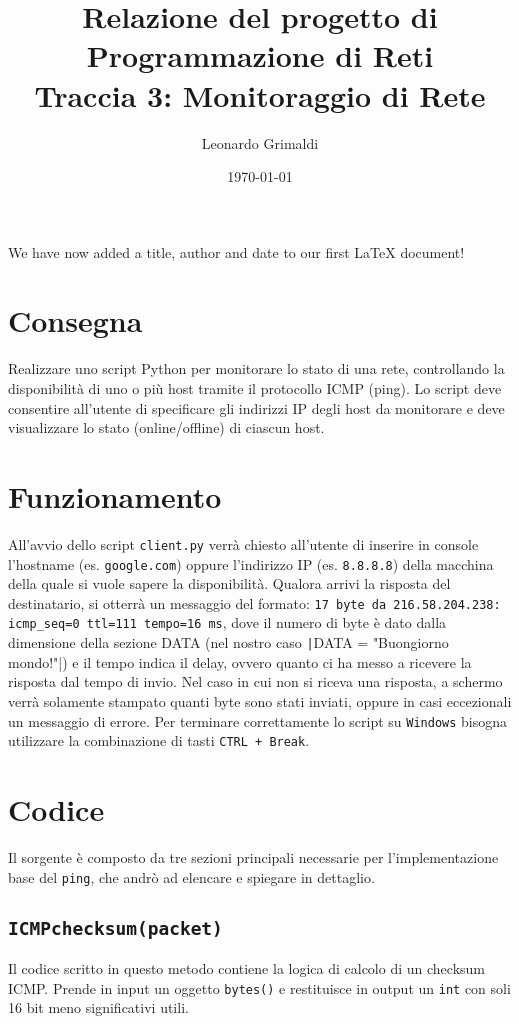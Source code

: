 \documentclass[a4paper,12pt]{report}
\title{Relazione del progetto di Programmazione di Reti 
    \\ Traccia 3: Monitoraggio di Rete}
\author{Leonardo Grimaldi}
\date{\today}
\begin{document}
\maketitle
We have now added a title, author and date to our first \LaTeX{} document!
\section{Consegna}
Realizzare uno script Python per monitorare lo stato di una rete, controllando la disponibilità di uno o più host tramite il protocollo ICMP (ping).
%
Lo script deve consentire all'utente di specificare gli indirizzi IP degli host da monitorare e deve visualizzare lo stato (online/offline) di ciascun host.
\section{Funzionamento}
All'avvio dello script \texttt{client.py} verrà chiesto all'utente di inserire in console l'hostname (es. \texttt{google.com}) oppure l'indirizzo IP (es. \texttt{8.8.8.8}) della macchina della quale si vuole sapere la disponibilità.
%
Qualora arrivi la risposta del destinatario, si otterrà un messaggio del formato: \texttt{17 byte da 216.58.204.238: icmp\_seq=0 ttl=111 tempo=16 ms}, dove il numero di byte è dato dalla dimensione della sezione DATA (nel nostro caso \texttt|DATA = "Buongiorno mondo!"|) e il tempo indica il delay, ovvero quanto ci ha messo a ricevere la risposta dal tempo di invio.
%
Nel caso in cui non si riceva una risposta, a schermo verrà solamente stampato quanti byte sono stati inviati, oppure in casi eccezionali un messaggio di errore.
%
Per terminare correttamente lo script su \texttt{Windows} bisogna utilizzare la combinazione di tasti \texttt{CTRL + Break}.
\section{Codice}
Il sorgente è composto da tre sezioni principali necessarie per l'implementazione base del \texttt{ping}, che andrò ad elencare e spiegare in dettaglio.
\subsection*{\texttt{ICMPchecksum(packet)}}
Il codice scritto in questo metodo contiene la logica di calcolo di un checksum ICMP.
%
Prende in input un oggetto \texttt{bytes()} e restituisce in output un \texttt{int} con soli 16 bit meno significativi utili.
%
\end{document}
